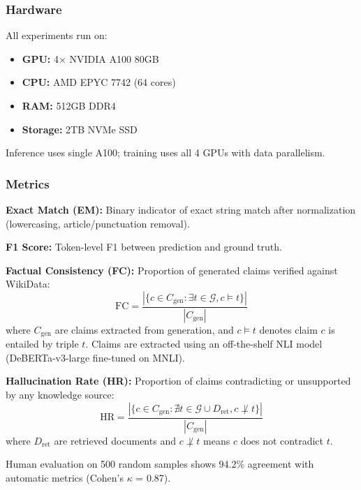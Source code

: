 \documentclass[conference]{IEEEtran}
\begin{document}
\subsubsection{Hardware}
\label{sec:hardware}

All experiments run on:
\begin{itemize}[leftmargin=*]
    \item \textbf{GPU:} 4$\times$ NVIDIA A100 80GB
    \item \textbf{CPU:} AMD EPYC 7742 (64 cores)
    \item \textbf{RAM:} 512GB DDR4
    \item \textbf{Storage:} 2TB NVMe SSD
\end{itemize}

Inference uses single A100; training uses all 4 GPUs with data parallelism.

\subsubsection{Metrics}
\label{sec:metrics}

\textbf{Exact Match (EM):} Binary indicator of exact string match after normalization (lowercasing, article/punctuation removal).

\textbf{F1 Score:} Token-level F1 between prediction and ground truth.

\textbf{Factual Consistency (FC):} Proportion of generated claims verified against WikiData:
\begin{equation}
\text{FC} = \frac{|\{c \in C_{\text{gen}} : \exists t \in \mathcal{G}, c \models t\}|}{|C_{\text{gen}}|}
\end{equation}
where $C_{\text{gen}}$ are claims extracted from generation, and $c \models t$ denotes claim $c$ is entailed by triple $t$. Claims are extracted using an off-the-shelf NLI model (DeBERTa-v3-large fine-tuned on MNLI).

\textbf{Hallucination Rate (HR):} Proportion of claims contradicting or unsupported by any knowledge source:
\begin{equation}
\text{HR} = \frac{|\{c \in C_{\text{gen}} : \nexists t \in \mathcal{G} \cup D_{\text{ret}}, c \not\perp t\}|}{|C_{\text{gen}}|}
\end{equation}
where $D_{\text{ret}}$ are retrieved documents and $c \not\perp t$ means $c$ does not contradict $t$.

Human evaluation on 500 random samples shows 94.2\% agreement with automatic metrics (Cohen's $\kappa$ = 0.87).
\end{document}
